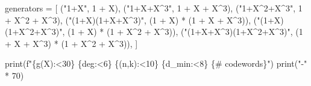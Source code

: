 \documentclass[
]{article}
\newenvironment{Shaded}{}{}
\newcommand{\BuiltInTok}[1]{\textcolor[rgb]{0.00,0.50,0.00}{#1}}
\newcommand{\DecValTok}[1]{\textcolor[rgb]{0.25,0.63,0.44}{#1}}
\newcommand{\NormalTok}[1]{#1}
\newcommand{\OperatorTok}[1]{\textcolor[rgb]{0.40,0.40,0.40}{#1}}
\newcommand{\SpecialCharTok}[1]{\textcolor[rgb]{0.25,0.44,0.63}{#1}}
\newcommand{\SpecialStringTok}[1]{\textcolor[rgb]{0.73,0.40,0.53}{#1}}
\newcommand{\StringTok}[1]{\textcolor[rgb]{0.25,0.44,0.63}{#1}}
\begin{document}
\begin{Shaded}
\begin{Highlighting}[]
\NormalTok{generators }\OperatorTok{=}\NormalTok{ [}
\NormalTok{    (}\StringTok{"1+X"}\NormalTok{,                    }\DecValTok{1} \OperatorTok{+}\NormalTok{ X),}
\NormalTok{    (}\StringTok{"1+X+X\^{}3"}\NormalTok{,                }\DecValTok{1} \OperatorTok{+}\NormalTok{ X }\OperatorTok{+}\NormalTok{ X}\OperatorTok{\^{}}\DecValTok{3}\NormalTok{),}
\NormalTok{    (}\StringTok{"1+X\^{}2+X\^{}3"}\NormalTok{,              }\DecValTok{1} \OperatorTok{+}\NormalTok{ X}\OperatorTok{\^{}}\DecValTok{2} \OperatorTok{+}\NormalTok{ X}\OperatorTok{\^{}}\DecValTok{3}\NormalTok{),}
\NormalTok{    (}\StringTok{"(1+X)(1+X+X\^{}3)"}\NormalTok{,         (}\DecValTok{1} \OperatorTok{+}\NormalTok{ X) }\OperatorTok{*}\NormalTok{ (}\DecValTok{1} \OperatorTok{+}\NormalTok{ X }\OperatorTok{+}\NormalTok{ X}\OperatorTok{\^{}}\DecValTok{3}\NormalTok{)),}
\NormalTok{    (}\StringTok{"(1+X)(1+X\^{}2+X\^{}3)"}\NormalTok{,       (}\DecValTok{1} \OperatorTok{+}\NormalTok{ X) }\OperatorTok{*}\NormalTok{ (}\DecValTok{1} \OperatorTok{+}\NormalTok{ X}\OperatorTok{\^{}}\DecValTok{2} \OperatorTok{+}\NormalTok{ X}\OperatorTok{\^{}}\DecValTok{3}\NormalTok{)),}
\NormalTok{    (}\StringTok{"(1+X+X\^{}3)(1+X\^{}2+X\^{}3)"}\NormalTok{,   (}\DecValTok{1} \OperatorTok{+}\NormalTok{ X }\OperatorTok{+}\NormalTok{ X}\OperatorTok{\^{}}\DecValTok{3}\NormalTok{) }\OperatorTok{*}\NormalTok{ (}\DecValTok{1} \OperatorTok{+}\NormalTok{ X}\OperatorTok{\^{}}\DecValTok{2} \OperatorTok{+}\NormalTok{ X}\OperatorTok{\^{}}\DecValTok{3}\NormalTok{)),}
\NormalTok{]}

\BuiltInTok{print}\NormalTok{(}\SpecialStringTok{f"}\SpecialCharTok{\{}\StringTok{\textquotesingle{}g(X)\textquotesingle{}}\SpecialCharTok{:\textless{}30\}}\SpecialStringTok{ }\SpecialCharTok{\{}\StringTok{\textquotesingle{}deg\textquotesingle{}}\SpecialCharTok{:\textless{}6\}}\SpecialStringTok{ }\SpecialCharTok{\{}\StringTok{\textquotesingle{}(n,k)\textquotesingle{}}\SpecialCharTok{:\textless{}10\}}\SpecialStringTok{ }\SpecialCharTok{\{}\StringTok{\textquotesingle{}d\_min\textquotesingle{}}\SpecialCharTok{:\textless{}8\}}\SpecialStringTok{ }\SpecialCharTok{\{}\StringTok{\textquotesingle{}\# codewords\textquotesingle{}}\SpecialCharTok{\}}\SpecialStringTok{"}\NormalTok{)}
\BuiltInTok{print}\NormalTok{(}\StringTok{"{-}"} \OperatorTok{*} \DecValTok{70}\NormalTok{)}


\end{Highlighting}
\end{Shaded}
\end{document}
